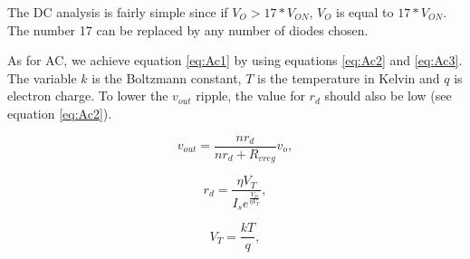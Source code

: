 The DC analysis is fairly simple since if $V_O>17*V_{ON}$, $V_O$ is equal to $17*V_{ON}$. The number 17 can be replaced by any number of diodes chosen. 

As for AC, we achieve equation \ref{eq:Ac1} by using equations \ref{eq:Ac2} and \ref{eq:Ac3}. The variable $k$ is the Boltzmann constant, $T$ is the temperature in Kelvin and $q$ is electron charge. To lower the $v_{out}$ ripple, the value for $r_d$ should also be low (see equation \ref{eq:Ac2}).

\begin{equation}
    v_{out}=\frac{n r_{d}}{n r_{d} + R_{vreg}}v_o,
    \label{eq:Ac1}
\end{equation}

\begin{equation}
    r_{d}=\frac{\eta V_T}{I_s e^{\frac{V_D}{\eta V_T}}},
    \label{eq:Ac2}
\end{equation}

\begin{equation}
    V_{T} = \frac{kT}{q},
    \label{eq:Ac3}
\end{equation}

\newpage 

\newpage 




